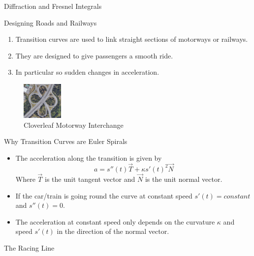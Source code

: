 \documentclass{beamer}
\begin{document}
\begin{frame}{Diffraction and Fresnel Integrals}
	
\end{frame}

\begin{frame}{Designing Roads and Railways}
	\begin{enumerate}
		\item Transition curves are used to link straight sections of motorways or railways.
		\item They are designed to give passengers a smooth ride.
		\item In particular so sudden changes in acceleration.

	\end{enumerate}
		\begin{figure}
		\caption{Cloverleaf Motorway Interchange}
		\centering
		\includegraphics[width=20mm, scale=0.5]{cloverleaf_motorway.png}
	\end{figure}

\end{frame}

\begin{frame}{Why Transition Curves are Euler Spirals}
	\begin{itemize}
	\item The acceleration along the transition is given by
 	 \[
 	 a=s''(t) \vec{T}+\kappa s'(t)^2 \vec{N}
 	 \]
 	 Where $\vec{T}$ is the unit tangent vector and $\vec{N}$ is the unit normal vector.
 	 \item If the car/train is going round the curve at constant speed $s'(t)=constant$ and $s''(t)=0$.	
 	 \item The acceleration at constant speed only depends on the curvature $\kappa$ and speed $s'(t)$ in the direction of the normal vector.
\end{itemize}

\end{frame}

\begin{frame}{The Racing Line}
	
\end{frame}
\end{document}
